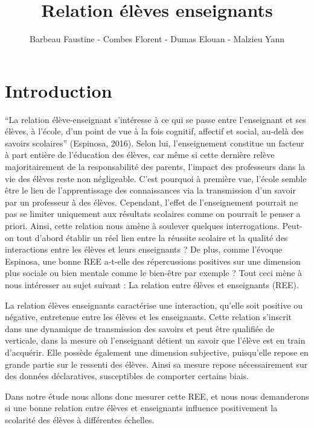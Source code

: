 \documentclass[
  french,
  11pt,
  a4paper,
  oneside]{report}
\title{Relation élèves enseignants}
\author{Barbeau Faustine - Combes Florent - Dumas Elouan - Malzieu Yann}
\date{}
\renewcommand*\contentsname{Table des matières}
\newcommand\contentsname{Table des matières}
\begin{document}
\maketitle

\renewcommand*\contentsname{Table des matières}
{
\setcounter{tocdepth}{2}
\tableofcontents
}
\listoffigures

\renewcommand{\contentsname}{Table des matières}

\chapter{Introduction}\label{introduction}

``La relation élève-enseignant s'intéresse à ce qui se passe entre
l'enseignant et ses élèves, à l'école, d'un point de vue à la fois
cognitif, affectif et social, au-delà des savoirs scolaires'' (Espinosa,
2016). Selon lui, l'enseignement constitue un facteur à part entière de
l'éducation des élèves, car même si cette dernière relève
majoritairement de la responsabilité des parents, l'impact des
professeurs dans la vie des élèves reste non négligeable. C'est pourquoi
à première vue, l'école semble être le lieu de l'apprentissage des
connaissances via la transmission d'un savoir par un professeur à des
élèves. Cependant, l'effet de l'enseignement pourrait ne pas se limiter
uniquement aux résultats scolaires comme on pourrait le penser a priori.
Ainsi, cette relation nous amène à soulever quelques interrogations.
Peut-on tout d'abord établir un réel lien entre la réussite scolaire et
la qualité des interactions entre les élèves et leurs enseignants ? De
plus, comme l'évoque Espinosa, une bonne REE a-t-elle des répercussions
positives sur une dimension plus sociale ou bien mentale comme le
bien-être par exemple ? Tout ceci mène à nous intéresser au sujet
suivant : La relation entre élèves et enseignants (REE).

La relation élèves enseignants caractérise une interaction, qu'elle soit
positive ou négative, entretenue entre les élèves et les enseignants.
Cette relation s'inscrit dans une dynamique de transmission des savoirs
et peut être qualifiée de verticale, dans la mesure où l'enseignant
détient un savoir que l'élève est en train d'acquérir. Elle possède
également une dimension subjective, puisqu'elle repose en grande partie
sur le ressenti des élèves. Ainsi sa mesure repose nécessairement sur
des données déclaratives, susceptibles de comporter certains biais.

Dans notre étude nous allons donc mesurer cette REE, et nous nous
demanderons si une bonne relation entre élèves et enseignants influence
positivement la scolarité des élèves à différentes échelles.
\end{document}
